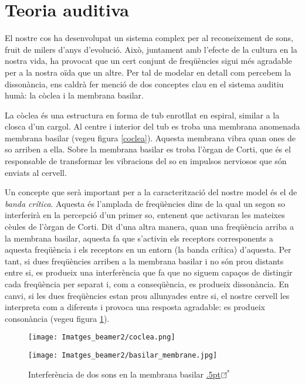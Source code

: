 \documentclass{article}
\theoremstyle{math}
\theoremstyle{TheoremNum}
\newcommand{\0}{\ensuremath{\vb{0}}}
\newcommand\enllas{\raise.5pt\hbox{$\boxempty\kern-4.85pt{}^{\nearrow}$}\kern-2pt}
\begin{document}
\section{Teoria auditiva}\label{teoria_auditiva}
El nostre cos ha desenvolupat un sistema complex per al reconeixement de sons, fruit de milers d'anys d'evolució. Això, juntament amb l'efecte de la cultura en la nostra vida, ha provocat que un cert conjunt de freqüències sigui més agradable per a la nostra oïda que un altre. Per tal de modelar en detall com percebem la dissonància, ens caldrà fer menció de dos conceptes clau en el sistema auditiu humà: la còclea i la membrana basilar. \par
La còclea és una estructura en forma de tub enrotllat en espiral, similar a la closca d'un cargol. Al centre i interior del tub es troba una membrana anomenada membrana basilar (vegeu figura \ref{coclea}). Aquesta membrana vibra quan ones de so arriben a ella. Sobre la membrana basilar es troba l'òrgan de Corti, que és el responsable de transformar les vibracions del so en impulsos nerviosos que són enviats al cervell.\par
Un concepte que serà important per a la caracterització del nostre model és el de \textit{banda crítica}. Aquesta és l'amplada de freqüències dins de la qual un segon so interferirà en la percepció d'un primer so, entenent que activaran les mateixes cè\lgem ules de l'òrgan de Corti. Dit d'una altra manera, quan una freqüència arriba a la membrana basilar, aquesta fa que s'activin els receptors corresponents a aquesta freqüència i els receptors en un entorn (la banda crítica) d'aquesta. Per tant, si dues freqüències arriben a la membrana basilar i no són prou distants entre si, es produeix una interferència que fa que no siguem capaços de distingir cada freqüència per separat i, com a conseqüència, es produeix dissonància. En canvi, si les dues freqüències estan prou allunyades entre si, el nostre cervell les interpreta com a diferents i provoca una resposta agradable: es produeix consonància (vegeu figura \ref{membrana}).\par
\begin{figure}[ht]
  \begin{minipage}[c]{0.49\linewidth}
    \centering
    \texttt{[image: Imatges\_beamer2/coclea.png]}
    \caption{Estructura de la còclea \href{https://www.pinterest.com/pin/336995984614355654/}{\enllas}}
    \label{coclea}
  \end{minipage}
  \hfill
  \begin{minipage}[c]{0.49\linewidth}
    \centering
    \texttt{[image: Imatges\_beamer2/basilar\_membrane.jpg]}
    \caption{Interferència de dos sons en la membrana basilar \href{https://www.phys.uconn.edu/~gibson/Notes/Section7_3/Sec7_3.htm}{\enllas}}
    \label{membrana}
  \end{minipage}
\end{figure}
\end{document}
